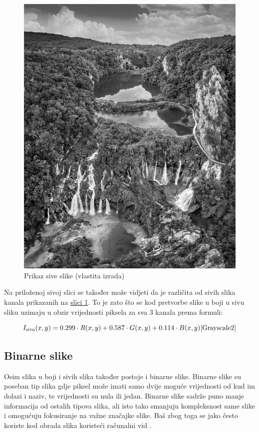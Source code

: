 \documentclass{foi}
\begin{document}
\begin{figure}[H]
    \centering
    \includegraphics[width=0.7\linewidth]{slike/Grayscale.jpeg}
    \caption{Prikaz sive slike (vlastita izrada)}
\end{figure}

Na priloženoj sivoj slici se također može vidjeti da je različita od sivih slika kanala prikazanih na \hyperref[fig:channels]{slici 1}. To je zato što se kod pretvorbe slike u boji u sivu sliku uzimaju u obzir vrijednosti piksela za sva 3 kanala prema formuli:

{\large
\[
    I_{\text{siva}}(x, y) = 0.299 \cdot R(x, y) + 0.587 \cdot G(x, y) + 0.114 \cdot B(x, y)\text{\cite{Grayscale2}}
\]
}


\subsection{Binarne slike}

Osim slika u boji i sivih slika također postoje i binarne slike. Binarne slike su poseban tip slika gdje piksel može imati samo dvije moguće vrijednosti od kud im dolazi i naziv, te vrijednosti su nula ili jedan. Binarne slike sadrže puno manje informacija od ostalih tipova slika, ali isto tako smanjuju kompleksnost same slike i omogućuju fokusiranje na važne značajke slike. Baš zbog toga se jako često koriste kod obrada slika koristeći računalni vid \cite{BinarySlika}.
\end{document}
